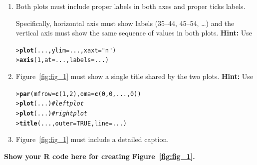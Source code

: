 \documentclass[a4paper,10pt]{article}\usepackage[]{graphicx}\usepackage[]{xcolor}
\makeatletter
\newcommand{\hlnum}[1]{\textcolor[rgb]{0.686,0.059,0.569}{#1}}%
\newcommand{\hlsng}[1]{\textcolor[rgb]{0.192,0.494,0.8}{#1}}%
\newcommand{\hlcom}[1]{\textcolor[rgb]{0.678,0.584,0.686}{\textit{#1}}}%
\newcommand{\hldef}[1]{\textcolor[rgb]{0.345,0.345,0.345}{#1}}%
\newcommand{\hlkwc}[1]{\textcolor[rgb]{0.333,0.667,0.333}{#1}}%
\newcommand{\hlkwd}[1]{\textcolor[rgb]{0.737,0.353,0.396}{\textbf{#1}}}%
\newenvironment{kframe}{%
 \def\at@end@of@kframe{}%
 \ifinner\ifhmode%
  \def\at@end@of@kframe{\end{minipage}}%
  \begin{minipage}{\columnwidth}%
 \fi\fi%
 \def\FrameCommand##1{\hskip\@totalleftmargin \hskip-\fboxsep
 \colorbox{shadecolor}{##1}\hskip-\fboxsep
     \hskip-\linewidth \hskip-\@totalleftmargin \hskip\columnwidth}%
 \MakeFramed {\advance\hsize-\width
   \@totalleftmargin\z@ \linewidth\hsize
   \@setminipage}}%
 {\par\unskip\endMakeFramed%
 \at@end@of@kframe}
\newenvironment{knitrout}{}{} %
\makeatother
\begin{document}
\begin{enumerate}
\begin{enumerate}
      \textbf{Hint:} Use \texttt{plot(log = "y", ...)}.
  
      \item Both plots must include proper labels in both axes and proper ticks labels.
  
      Specifically, horizontal axis must show labels (35--44, 45--54, \ldots) and the vertical axis must show the same sequence of values in both plots. \textbf{Hint:} Use
  
\begin{knitrout}\footnotesize
{}\color{fgcolor}\begin{kframe}
\begin{alltt}
\hldef{> }  \hlkwd{plot}\hldef{(...,} \hlkwc{ylim} \hldef{= ...,} \hlkwc{xaxt} \hldef{=} \hlsng{"n"}\hldef{)}
\hldef{> }  \hlkwd{axis}\hldef{(}\hlnum{1}\hldef{,} \hlkwc{at} \hldef{= ...,} \hlkwc{labels} \hldef{= ...)}
\end{alltt}
\end{kframe}
\end{knitrout}
      
      \item Figure~\ref{fig:fig_1} must show a single title shared by the two plots. \textbf{Hint:} Use
  
\begin{knitrout}\footnotesize
{}\color{fgcolor}\begin{kframe}
\begin{alltt}
\hldef{> }  \hlkwd{par}\hldef{(}\hlkwc{mfrow} \hldef{=} \hlkwd{c}\hldef{(}\hlnum{1}\hldef{,} \hlnum{2}\hldef{),} \hlkwc{oma} \hldef{=} \hlkwd{c}\hldef{(}\hlnum{0}\hldef{,} \hlnum{0}\hldef{, ...,} \hlnum{0}\hldef{))}
\hldef{> }  \hlkwd{plot}\hldef{(...)}  \hlcom{# left plot}
\hldef{> }  \hlkwd{plot}\hldef{(...)}  \hlcom{# right plot}
\hldef{> }  \hlkwd{title}\hldef{(...,} \hlkwc{outer} \hldef{=} \hlnum{TRUE}\hldef{,} \hlkwc{line} \hldef{= ...)}
\end{alltt}
\end{kframe}
\end{knitrout}

      \item Figure~\ref{fig:fig_1} must include a detailed caption.
  
  \end{enumerate}
  
  \textbf{Show your R code here for creating Figure~\ref{fig:fig_1}.}
  

\end{enumerate}
\end{document}
